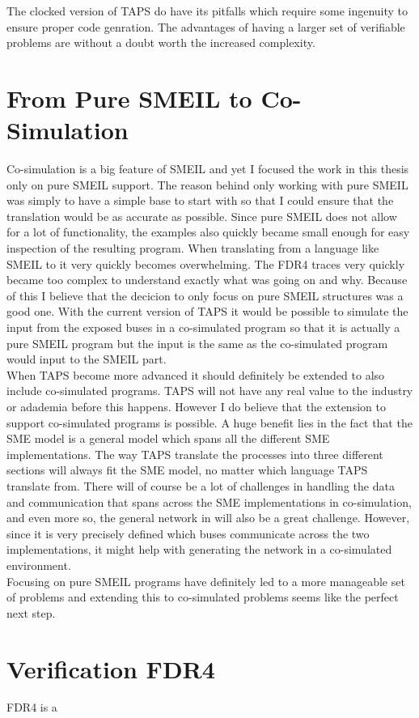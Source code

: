 
The clocked version of TAPS do have its pitfalls which require some ingenuity to ensure proper code genration. The advantages of having a larger set of verifiable problems are without a doubt worth the increased complexity.
\section{From Pure SMEIL to Co-Simulation}
Co-simulation is a big feature of SMEIL and yet I focused the work in this thesis only on pure SMEIL support. The reason behind only working with pure SMEIL was simply to have a simple base to start with so that I could ensure that the translation would be as accurate as possible. Since pure SMEIL does not allow for a lot of functionality, the examples also quickly became small enough for easy inspection of the resulting \cspm{} program. When translating from a language like SMEIL to \cspm{} it very quickly becomes overwhelming. The FDR4 traces very quickly became too complex to understand exactly what was going on and why. Because of this I believe that the decicion to only focus on pure SMEIL structures was a good one.
With the current version of TAPS it would be possible to simulate the input from the exposed buses in a co-simulated program so that it is actually a pure SMEIL program but the input is the same as the co-simulated program would input to the SMEIL part.\\

When TAPS become more advanced it should definitely be extended to also include co-simulated programs. TAPS will not have any real value to the industry or adademia before this happens. However I do believe that the extension to support co-simulated programs is possible. A huge benefit lies in the fact that the SME model is a general model which spans all the different SME implementations. The way TAPS translate the processes into three different sections will always fit the SME model, no matter which language TAPS translate from.
There will of course be a lot of challenges in handling the data and communication that spans across the SME implementations in co-simulation, and even more so, the general network in \cspm{} will also be a great challenge. However, since it is very precisely defined which buses communicate across the two implementations, it might help with generating the \cspm{} network in a co-simulated environment.\\

Focusing on pure SMEIL programs have definitely led to a more manageable set of problems and extending this to co-simulated problems seems like the perfect next step.

\section{Verification FDR4}
FDR4 is a 

